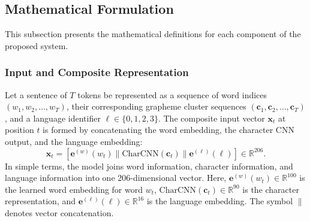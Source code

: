 \documentclass[pdflatex,sn-mathphys-num]{sn-jnl}
\begin{document}
\subsection{Mathematical Formulation}\label{subsec:math_formulation}

This subsection presents the mathematical definitions for each component of the proposed system.

\subsubsection{Input and Composite Representation}
Let a sentence of $T$ tokens be represented as a sequence of word indices $(w_1, w_2, \ldots, w_T)$, their corresponding grapheme cluster sequences $(\mathbf{c}_1, \mathbf{c}_2, \ldots, \mathbf{c}_T)$, and a language identifier $\ell \in \{0, 1, 2, 3\}$. The composite input vector $\mathbf{x}_t$ at position $t$ is formed by concatenating the word embedding, the character CNN output, and the language embedding:
\begin{equation}
\mathbf{x}_t = [\mathbf{e}^{(w)}(w_t) \parallel \text{CharCNN}(\mathbf{c}_t) \parallel \mathbf{e}^{(\ell)}(\ell)] \in \mathbb{R}^{206}.
\end{equation}
In simple terms, the model joins word information, character information, and language information into one 206-dimensional vector. Here, $\mathbf{e}^{(w)}(w_t) \in \mathbb{R}^{100}$ is the learned word embedding for word $w_t$, $\text{CharCNN}(\mathbf{c}_t) \in \mathbb{R}^{90}$ is the character representation, and $\mathbf{e}^{(\ell)}(\ell) \in \mathbb{R}^{16}$ is the language embedding. The symbol $\parallel$ denotes vector concatenation.
\end{document}
